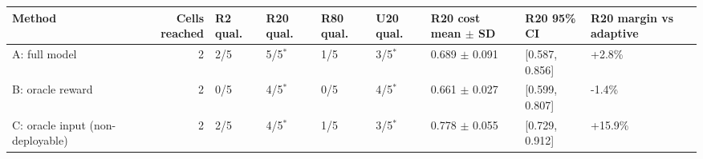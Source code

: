\begin{tabular}{lrlllllll}
\hline
Method & Cells reached & R2 qual. & R20 qual. & R80 qual. & U20 qual. & R20 cost mean $\pm$ SD & R20 95\% CI & R20 margin vs adaptive \\
\hline
A: full model & 2 & 2/5 & 5/5$^\ast$ & 1/5 & 3/5$^\ast$ & 0.689 $\pm$ 0.091 & [0.587, 0.856] & +2.8\% \\
B: oracle reward & 2 & 0/5 & 4/5$^\ast$ & 0/5 & 4/5$^\ast$ & 0.661 $\pm$ 0.027 & [0.599, 0.807] & -1.4\% \\
C: oracle input (non-deployable) & 2 & 2/5 & 4/5$^\ast$ & 1/5 & 3/5$^\ast$ & 0.778 $\pm$ 0.055 & [0.729, 0.912] & +15.9\% \\
\hline
\end{tabular}
